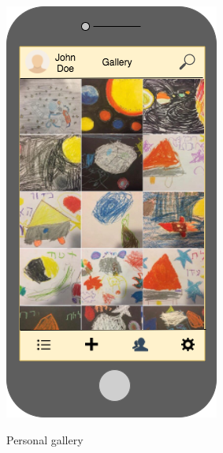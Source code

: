 \begin{figure}[H]
  \hspace{1cm}
  \begin{minipage}[b]{0.31\linewidth}
    \caption{Personal gallery}
    \includegraphics[width=\linewidth]{Appendix/HorizontalPrototype/2.png}
    \label{PersonalGallery}
  \end{minipage}
\end{figure}
